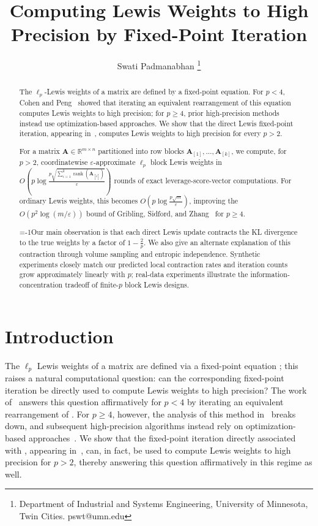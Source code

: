 \documentclass[11pt]{article}
\title{Computing Lewis Weights to High Precision by Fixed-Point Iteration}
\author{Swati Padmanabhan
\thanks{Department of Industrial and Systems Engineering, University of Minnesota, Twin Cities. pswt@umn.edu}}
\date{}
\theoremstyle{plain}
\numberwithin{equation}{section}
\newcommand{\rank}{\operatorname{rank}}
\newcommand{\bA}{\mathbf{A}}
\begin{document}
\maketitle


\begin{abstract}
The $\ell_p$-Lewis weights of a matrix are defined by a fixed-point equation. For $p<4$, Cohen and Peng~\cite{cohen2015lp} showed that iterating an equivalent rearrangement of this equation computes Lewis weights to high precision; for $p\geq4$, prior high-precision methods instead use optimization-based approaches. We show that the direct Lewis fixed-point iteration, appearing in~\cite{lee2016faster}, computes Lewis weights to high precision for every $p>2$.

For a matrix $\bA\in\mathbb R^{m\times n}$ partitioned into row blocks $\bA_{[1]},\ldots,\bA_{[k]}$, we compute, for $p>2$, coordinatewise $\varepsilon$-approximate $\ell_p$ block Lewis weights in $O\left(p\log\frac{p\sqrt{ \sum_{i=1}^k\rank(\bA_{[i]}) }}{\varepsilon}\right)$ 
rounds of exact leverage-score-vector computations. For ordinary Lewis weights, this becomes
$O\left(p\log\frac{p\sqrt m}{\varepsilon}\right)$, improving the $O(p^2\log(m/\varepsilon))$ bound of Gribling, Sidford, and Zhang~\cite{pmlr-v336-gribling26a} for $p\geq4$.

\looseness=-1Our main observation is that each direct Lewis update contracts the KL divergence to the true weights by a factor of $1-\frac{2}{p}$. We also give an alternate explanation of this contraction through volume sampling and entropic independence. Synthetic experiments closely match our predicted local contraction rates and iteration counts grow approximately linearly with $p$; real-data experiments illustrate the information-concentration tradeoff of finite-$p$ block Lewis designs.
\end{abstract}
\newpage 
\section{Introduction}
\label{sec:intro}

The $\ell_p$ Lewis weights of a matrix are defined via a fixed-point equation ; this raises a natural computational question: can the corresponding fixed-point iteration be directly used to compute Lewis weights to high precision? 
The work of~\cite{cohen2015lp} answers this question affirmatively for $p<4$ by iterating an equivalent rearrangement of . 
For $p\geq4$, however, the analysis of this method in~\cite{cohen2015lp} breaks down, and subsequent high-precision algorithms instead rely on optimization-based approaches~\cite{cohen2015lp,lee2016faster,lee2019solving,fazel2022computing,pmlr-v336-gribling26a}.
We show that the fixed-point iteration directly associated with , appearing in~\cite{lee2016faster}, can, in fact, be used to compute Lewis weights to high precision for $p>2$, thereby answering this question affirmatively in this regime as well.
\end{document}
